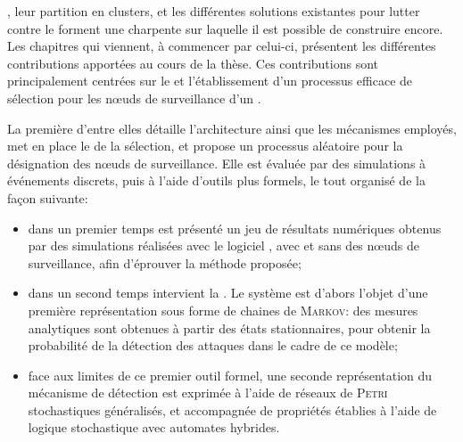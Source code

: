 
, leur partition en clusters, et les différentes solutions existantes pour lutter contre le \dds forment une charpente sur laquelle il est possible de construire encore.
Les chapitres qui viennent, à commencer par celui-ci, présentent les différentes contributions apportées au cours de la thèse.
Ces contributions sont principalement centrées sur le  et l'établissement d'un processus efficace de sélection pour les nœuds de surveillance d'un \rcs.

La première d'entre elles détaille l'architecture ainsi que les mécanismes employés, met en place le  de la sélection, et propose un processus aléatoire pour la désignation des nœuds de surveillance.
Elle est évaluée par des simulations à événements discrets, puis à l'aide d'outils plus formels, le tout organisé de la façon suivante:
\begin{itemize}
    \item dans un premier temps est présenté un jeu de résultats numériques obtenus par des simulations réalisées avec le logiciel \nsii, avec et sans  des nœuds de surveillance, afin d'éprouver la méthode proposée;
    \item dans un second temps intervient la . Le système est d'abors l'objet d'une première représentation sous forme de chaines de \textsc{Markov}: des mesures analytiques sont obtenues à partir des états stationnaires, pour obtenir la probabilité de la détection des attaques dans le cadre de ce modèle;
    \item face aux limites de ce premier outil formel, une seconde représentation du mécanisme de détection est exprimée à l'aide de réseaux de \textsc{Petri} stochastiques généralisés, et accompagnée de propriétés établies à l'aide de logique stochastique avec automates hybrides.
\end{itemize}
